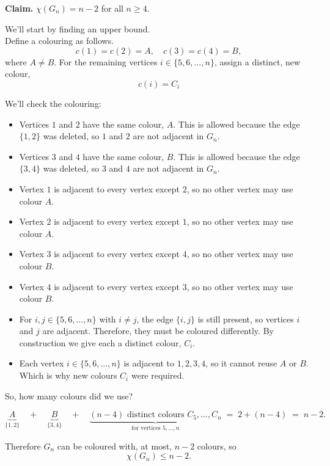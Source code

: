 \documentclass[a4paper,11pt]{report}
\begin{document}
\medskip
\textbf{Claim.} $\chi(G_n) = n - 2$ for all $n \ge 4$. \vspace{0.5em}

\Proof \vspace{0.25em}

We'll start by finding an upper bound. \\

Define a colouring as follows.
\[
  c(1) = c(2) = A, \quad
  c(3) = c(4) = B,
\]
where $A \ne B$. For the remaining vertices $i \in \{5,6,\dots,n\}$, assign a distinct, new colour,
\[
  c(i) = C_i
\]

We'll check the colouring:

\begin{itemize}
    \item Vertices $1$ and $2$ have the same colour, $A$. This is allowed because the edge $\{1,2\}$ was deleted, so $1$ and $2$ are not adjacent in $G_n$.
    \item Vertices $3$ and $4$ have the same colour, $B$. This is allowed because the edge $\{3,4\}$ was deleted, so $3$ and $4$ are not adjacent in $G_n$.
    \item Vertex $1$ is adjacent to every vertex except $2$, so no other vertex may use colour $A$.
    \item Vertex $2$ is adjacent to every vertex except $1$, so no other vertex may use colour $A$.
    \item Vertex $3$ is adjacent to every vertex except $4$, so no other vertex may use colour $B$.
    \item Vertex $4$ is adjacent to every vertex except $3$, so no other vertex may use colour $B$.
    \item For $i,j \in \{5,6,\dots,n\}$ with $i \ne j$, the edge $\{i,j\}$ is still present, so vertices $i$ and $j$ are adjacent. Therefore, they must be coloured differently. By construction we give each a distinct colour, $C_i$.
    \item Each vertex $i \in \{5,6,\dots,n\}$ is adjacent to $1,2,3,4$, so it cannot reuse $A$ or $B$. Which is why new colours $C_i$ were required.
\end{itemize}

So, how many colours did we use?

\[
\underbrace{A}_{\{1,2\}}
\quad+\quad
\underbrace{B}_{\{3,4\}}
\quad+\quad
\underbrace{(n-4)\text{ distinct colours }C_5,\dots,C_n}_{\text{for vertices }5,\dots,n}
\;=\;
2 + (n-4)
\;=\;
n-2.
\]

Therefore $G_n$ can be coloured with, at most, $n-2$ colours, so
\[
  \chi(G_n) \le n-2.
\]
\end{document}
